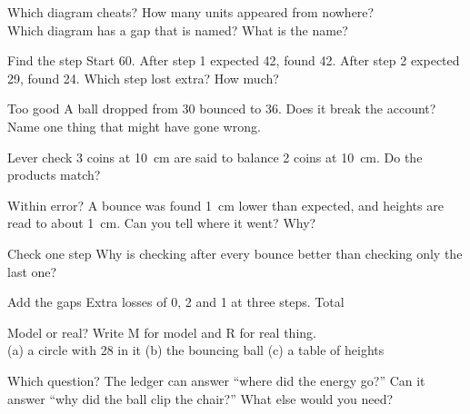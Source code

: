 Which diagram cheats? \wline[1.6cm] How many units appeared from nowhere? \wline[1.6cm]\\[8pt]
Which diagram has a gap that is named? \wline[1.6cm] What is the name? \wline[3cm]

\clearpage

\begin{puzzle}{Find the step}
Start 60. After step 1 expected 42, found 42. After step 2 expected 29, found 24. Which step lost extra? \wline[1.6cm] How much? \wline[1.6cm]
\end{puzzle}

\begin{puzzle}{Too good}
A ball dropped from 30 bounced to 36. Does it break the account? \wline[2cm] Name one thing that might have gone wrong. \wline[4cm]
\end{puzzle}

\begin{puzzle}{Lever check}
3 coins at 10~cm are said to balance 2 coins at 10~cm. Do the products match? \wline[2cm]
\end{puzzle}

\begin{puzzle}{Within error?}
A bounce was found 1~cm lower than expected, and heights are read to about 1~cm. Can you tell where it went? \wline[2cm] Why? \wline[4cm]
\end{puzzle}

\begin{puzzle}{Check one step}
Why is checking after every bounce better than checking only the last one? \wline[6cm]
\end{puzzle}

\clearpage

\begin{puzzle}{Add the gaps}
Extra losses of 0, 2 and 1 at three steps. Total \wline[1.6cm]
\end{puzzle}

\begin{puzzle}{Model or real?}
Write M for model and R for real thing.\\
(a) a circle with 28 in it \wline[1cm] \quad (b) the bouncing ball \wline[1cm] \quad (c) a table of heights \wline[1cm]
\end{puzzle}

\begin{puzzle}{Which question?}
The ledger can answer ``where did the energy go?'' Can it answer ``why did the ball clip the chair?'' \wline[2cm] What else would you need? \wline[4cm]
\end{puzzle}

